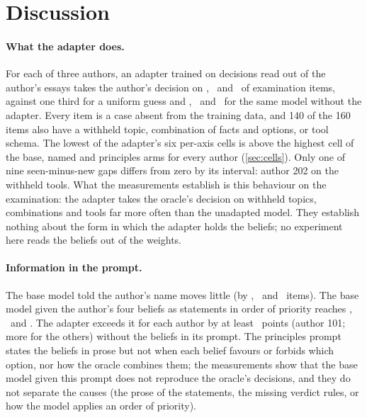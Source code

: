 
\section{Discussion}\label{sec:discussion}

\paragraph{What the adapter does.}
For each of three authors, an adapter trained on decisions read out of the author's essays
takes the author's decision on \AccATuned, \AccBTuned\ and \AccCTuned\ of examination items,
against one third for a uniform guess and \AccABase, \AccBBase\ and \AccCBase\ for the same model
without the adapter. Every item is a case absent from the training data, and 140 of the 160
items also have a withheld topic, combination of facts and options, or tool schema.
The lowest of the adapter's six per-axis cells is above the highest cell of the base, named
and principles arms for every author (\cref{sec:cells}). Only one of nine seen-minus-new gaps
differs from zero by its interval: author 202 on the withheld tools. What the measurements
establish is this behaviour on the examination: the adapter takes the oracle's decision on
withheld topics, combinations and tools far more often than the unadapted model. They
establish nothing about the form in which the adapter holds the beliefs; no experiment here
reads the beliefs out of the weights.

\paragraph{Information in the prompt.}
The base model told the author's name moves little (by \LiftANamed, \LiftBNamed\ and
\LiftCNamed\ items). The base model given the author's four beliefs as statements in order of
priority reaches \AccAPrinciples, \AccBPrinciples\ and \AccCPrinciples. The adapter exceeds it
for each author by at least \LeadPtsTunedPrinciplesA\ points (author 101; more for the
others) without the beliefs in its prompt. The principles prompt states the beliefs in prose
but not when each belief favours or forbids which option, nor how the oracle combines them;
the measurements show that the base model given this prompt does not reproduce the oracle's
decisions, and they do not separate the causes (the prose of the statements, the missing
verdict rules, or how the model applies an order of priority).


